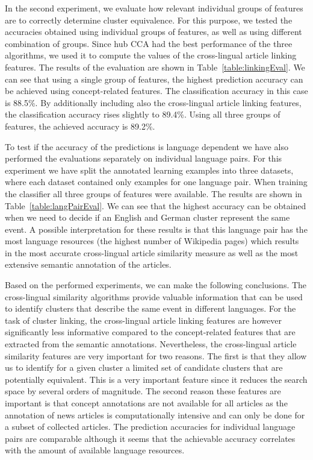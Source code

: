 \documentclass[twoside,11pt]{article}
\begin{document}
In the second experiment, we evaluate how relevant individual groups of features are to correctly determine cluster equivalence. For this purpose, we tested the accuracies obtained using individual groups of features, as well as using different combination of groups. Since hub CCA had the best  performance of the three algorithms, we used it to compute the values of the cross-lingual article linking features. The results of the evaluation are shown in Table~\ref{table:linkingEval}. We can see that using a single group of features, the highest prediction accuracy can be achieved using  concept-related features. The classification accuracy in this case is 88.5\%. By additionally including also the cross-lingual article linking features, the classification accuracy rises slightly to 89.4\%. Using all three groups of features, the achieved accuracy is 89.2\%.

To test if the accuracy of the predictions is language dependent we have also performed the evaluations separately on individual language pairs. For this experiment we have split the annotated learning examples into three datasets, where each dataset contained only examples for one language pair. When training the classifier all three groups of features were available. The results are shown in Table~\ref{table:langPairEval}. We can see that the highest accuracy can be obtained when we need to decide if an English and German cluster represent the same event. A possible interpretation for these results is that this language pair has the most language resources (the highest number of Wikipedia pages) which results in the most accurate cross-lingual article similarity measure as well as the most extensive semantic annotation of the articles.

Based on the performed experiments, we can make the following conclusions. The cross-lingual similarity algorithms provide valuable information that can be used to identify clusters that describe the same event in different languages. For the task of cluster linking, the cross-lingual article linking features are however significantly less informative compared to the concept-related features that are extracted from the semantic annotations. Nevertheless, the cross-lingual article similarity features are very important for two reasons. The first  is that they allow us to identify for a given cluster a limited set of candidate clusters that are potentially equivalent. This is a very important feature since it reduces the search space by several orders of magnitude. The second reason these features are important is that concept annotations are not available for all articles as the annotation of news articles is computationally intensive and can only be done for a subset of collected articles. The prediction accuracies for individual language pairs are comparable although it seems that the achievable accuracy correlates with the amount of available language resources.
\end{document}

